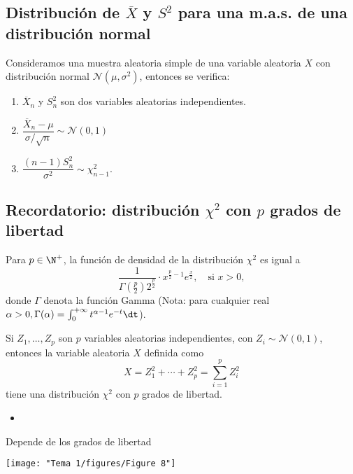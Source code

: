 \subsection{Distribución de $\overline{X}$ y  $S^2$ para una m.a.s. de una distribución normal}
\begin{tcolorbox}[colback=blue!5!white, colframe=blue!75!black, title=\textbf{Teorema de Fisher}]
Consideramos una muestra aleatoria simple de una variable aleatoria $X$ con distribución normal  $\mathcal{N}(\mu,\sigma^2)$, entonces se verifica:
\begin{enumerate}[label=\arabic*)]
  \item $\overline{X}_n$ y  $S_n^2$ son dos variables aleatorias independientes.
  \item $\dfrac{\overline{X}_n-\mu}{\sigma / \sqrt{n} }\sim \mathcal{N}(0,1)$
  \item $\dfrac{(n-1)S_n^2}{\sigma^2}\sim \chi_{n-1}^2$.
\end{enumerate}
\end{tcolorbox}
\subsection{Recordatorio: distribución $\chi^2$ con $p$ grados de libertad}
\begin{tcolorbox}[colback=blue!5!white, colframe=blue!75!black, title=\textbf{La distribución $\chi^2$.}]
Para $p\in \N^{+}$, la función de densidad de la distribución $\chi^2$ es igual a \[
\dfrac{1}{\Gamma\left( \frac{p}{2}  \right) 2^{\frac{p}{2} }}\cdot x^{\frac{p}{2} -1}e^{\frac{x}{2} },\quad \text{si }x>0,
\] donde $\Gamma$ denota la función Gamma (Nota: para cualquier real $\alpha>0,\Gamma(\alpha)=\int_{0}^{+\infty} t^{\alpha-1}e^{-t}\dt$).
\end{tcolorbox}
\begin{tcolorbox}[colback=blue!5!white, colframe=blue!75!black, title=\textbf{Caracterización de la $\chi^2$}]
Si $ Z_1,\dots,Z_p$ son $p$ variables aleatorias independientes, con $Z_i\sim \mathcal{N}(0,1)$, entonces la variable aleatoria $X$ definida como \[
X=Z_1^2+\cdots+Z_p^2=\sum_{i=1}^{p} Z_i^2
\] tiene una distribución $\chi^2$ con $p$ grados de libertad.
\end{tcolorbox}
\begin{itemize}[label=\color{red}\textbullet, leftmargin=*]
  \item {}
\end{itemize}
Depende de los grados de libertad
\begin{center}
  \texttt{[image: "Tema 1/figures/Figure 8"]}
\end{center}
